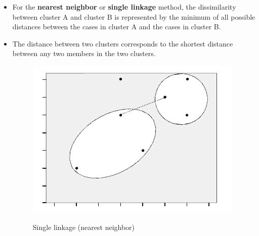 \documentclass[a4paper,12pt]{article}
\begin{document}
\begin{itemize}
		\item For the \textbf{nearest neighbor} or \textbf{single linkage} method, the dissimilarity between cluster A and cluster B is represented by the minimum of all possible distances between the cases in cluster A and the cases in cluster B.
		
	\item The distance between two clusters corresponds
	to the shortest distance between any two members in the two clusters.
	\begin{figure}[h!]
		\begin{center}
			\includegraphics[scale=0.4]{images/Link1.jpg}\\
			\caption{Single linkage (nearest neighbor)}
		\end{center}
	\end{figure}		
\end{itemize}
\end{document}

